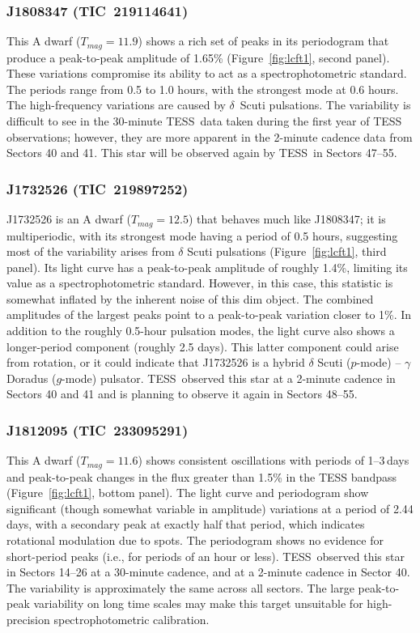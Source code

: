 \documentclass[twocolumn]{aastex631}
\newcommand{\tess}{TESS}
\begin{document}
\vspace{2em}
\subsubsection{J1808347 (TIC~219114641)}

This A dwarf ($T_{mag}=11.9$) shows a rich set of peaks in its periodogram that produce a peak-to-peak amplitude of 1.65\% (Figure~\ref{fig:lcft1}, second panel). These variations compromise its ability to act as a spectrophotometric standard. The periods range from 0.5 to 1.0 hours, with the strongest mode at 0.6 hours.  The high-frequency variations are caused by $\delta$~Scuti pulsations.  The variability is difficult to see in the 30-minute \tess\ data taken during the first year of TESS observations; however, they are more apparent in the 2-minute cadence data from Sectors 40 and 41.  This star will be observed again by \tess\ in Sectors 47--55.  


\subsubsection{J1732526 (TIC~219897252)}

J1732526 is an A dwarf ($T_{mag}=12.5$) that behaves much like J1808347; it is multiperiodic, with its strongest mode having a period of 0.5 hours, suggesting most of the variability arises from $\delta$ Scuti pulsations (Figure~\ref{fig:lcft1}, third panel). Its light curve has a peak-to-peak amplitude of roughly 1.4\%, limiting its value as a spectrophotometric standard. However, in this case, this statistic is somewhat inflated by the inherent noise of this dim object. The combined amplitudes of the largest peaks point to a peak-to-peak variation closer to 1\%.  In addition to the roughly 0.5-hour pulsation modes, the light curve also shows a longer-period component (roughly 2.5 days). This latter component could arise from rotation, or it could indicate that J1732526 is a hybrid $\delta$ Scuti ($p$-mode) -- $\gamma$ Doradus ($g$-mode) pulsator. \tess\ observed this star at a 2-minute cadence in Sectors 40 and 41 and is planning to observe it again in Sectors 48--55.


\subsubsection{J1812095 (TIC~233095291)}

This A dwarf ($T_{mag}=11.6$) shows consistent oscillations with periods of 1--3\,days and peak-to-peak changes in the flux greater than 1.5\% in the TESS bandpass (Figure~\ref{fig:lcft1}, bottom panel).  The light curve and periodogram show significant (though somewhat variable in amplitude) variations at a period of 2.44 days, with a secondary peak at exactly half that period, which indicates rotational modulation due to spots.  The periodogram shows no evidence for short-period peaks (i.e., for periods of an hour or less).  \tess\ observed this star in Sectors 14--26 at a 30-minute cadence, and at a 2-minute cadence in Sector 40.  The variability is approximately the same across all sectors. The large peak-to-peak variability on long time scales may make this target unsuitable for high-precision spectrophotometric calibration.
\end{document}
